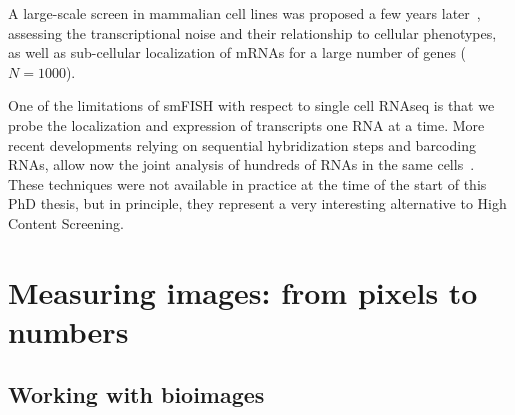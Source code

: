 A large-scale screen in mammalian cell lines was proposed a few years later~\cite{Battich2013,Battich2015}, assessing the transcriptional noise and their relationship to cellular phenotypes, as well as sub-cellular localization of m\ac{RNA}s for a large number of genes ($N=1000$). 

One of the limitations of smFISH with respect to single cell RNAseq is that we probe the localization and expression of transcripts one RNA at a time. More recent developments relying on sequential hybridization steps and barcoding RNAs, allow now the joint analysis of hundreds of \ac{RNA}s in the same cells~\cite{lubeck_single_cell_2014, Chen_2015, eng_seqfish_2019, fazalAtlasSubcellularRNA2019}. These techniques were not available in practice at the time of the start of this PhD thesis, but in principle, they represent a very interesting alternative to High Content Screening. 











\section{Measuring images: from pixels to numbers}
\label{sec:computation_biology}

\subsection{Working with bioimages}
\label{subsec:intro_bioimages}

